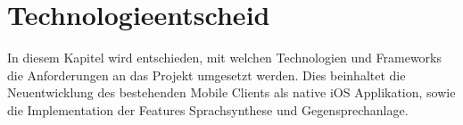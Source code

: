 \section{Technologieentscheid}

In diesem Kapitel wird entschieden, mit welchen Technologien und Frameworks die Anforderungen an das Projekt umgesetzt werden.
Dies beinhaltet die Neuentwicklung des bestehenden Mobile Clients als native iOS Applikation, sowie die Implementation der Features Sprachsynthese und Gegensprechanlage.




